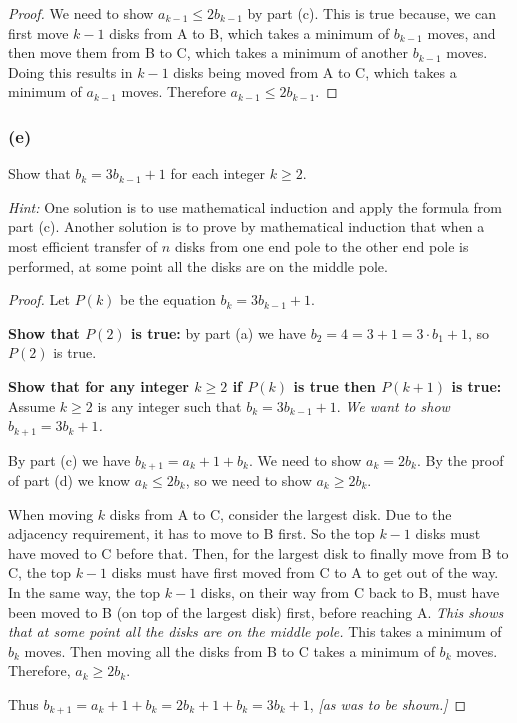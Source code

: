 \documentclass[14pt]{extarticle}
\begin{document}
\begin{proof}
We need to show $a_{k-1} \leq 2b_{k-1}$ by part (c). This is true because, we can first move $k-1$ disks from A to B, 
which takes a minimum of $b_{k-1}$ moves, and then move them from B to C, which takes a minimum of another $b_{k-1}$ 
moves. Doing this results in $k-1$ disks being moved from A to C, which takes a minimum of $a_{k-1}$ moves.
Therefore $a_{k-1} \leq 2b_{k-1}$.
\end{proof}

\subsubsection{(e)}
Show that $b_k = 3b_{k - 1} + 1$ for each integer $k \geq 2$.

{\it Hint:} One solution is to use mathematical induction and apply the formula from part (c). Another solution is to 
prove by mathematical induction that when a most efficient transfer of $n$ disks from one end pole to the other end 
pole is performed, at some point all the disks are on the middle pole.

\begin{proof}
Let $P(k)$ be the equation $b_k = 3b_{k - 1} + 1$.

{\bf Show that $P(2)$ is true:} by part (a) we have $b_2 = 4 = 3 + 1 = 3 \cdot b_1 + 1$, so $P(2)$ is true.

{\bf Show that for any integer $k \geq 2$ if $P(k)$ is true then $P(k+1)$ is true:}
Assume $k \geq 2$ is any integer such that $b_k = 3b_{k - 1} + 1$. {\it We want to show $b_{k+1} = 3b_{k} + 1$.}

By part (c) we have $b_{k+1} = a_k + 1 + b_k$. We need to show $a_k = 2b_k$. By the proof of part (d) we know 
$a_k \leq 2b_k$, so we need to show $a_k \geq 2b_k$.

When moving $k$ disks from A to C, consider the largest disk. Due to the adjacency requirement, it has to move to B
first. So the top $k-1$ disks must have moved to C before that. Then, for the largest disk to finally move from B to 
C, the top $k-1$ disks must have first moved from C to A to get out of the way. In the same way, the top $k-1$ disks, on their way from C back to B, must have been moved to B (on top of the largest disk) first, before reaching A. 
{\it This shows that at some point all the disks are on the middle pole.} This takes a minimum of $b_k$ moves. Then 
moving all the disks from B to C takes a minimum of $b_k$ moves. Therefore, $a_k \geq 2b_k$.

Thus $b_{k+1} = a_k + 1 + b_k = 2b_k + 1 + b_k = 3b_k + 1$, {\it [as was to be shown.]}
\end{proof}
\end{document}

